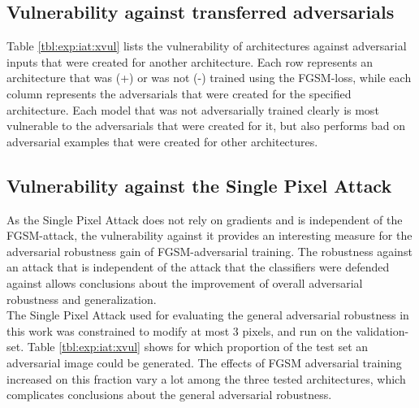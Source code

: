 \documentclass[draft,final]{vutinfth} %
\begin{document}
\subsection{Vulnerability against transferred adversarials}

\begin{table}[h]
	\noindent{}
		\caption{Accuracies on transferred adversarial examples}
		\label{tbl:exp:iat:xvul}
\end{table}

Table \ref{tbl:exp:iat:xvul} lists the vulnerability of architectures against adversarial inputs that were created for another architecture.
Each row represents an architecture that was (+) or was not (-) trained using the FGSM-loss, while each column represents the adversarials that were created for the specified architecture.
Each model that was not adversarially trained clearly is most vulnerable to the adversarials that were created for it, but also performs bad on adversarial examples that were created for other architectures.

\subsection{Vulnerability against the Single Pixel Attack}

As the Single Pixel Attack does not rely on gradients and is independent of the FGSM-attack, the vulnerability against it provides an interesting measure for the adversarial robustness gain of FGSM-adversarial training.
The robustness against an attack that is independent of the attack that the classifiers were defended against allows conclusions about the improvement of overall adversarial robustness and generalization.\\
The Single Pixel Attack used for evaluating the general adversarial robustness in this work was constrained to modify at most 3 pixels, and run on the validation-set.
Table \ref{tbl:exp:iat:xvul} shows for which proportion of the test set an adversarial image could be generated.
The effects of FGSM adversarial training increased on this fraction vary a lot among the three tested architectures, which complicates conclusions about the general adversarial robustness.
\end{document}

